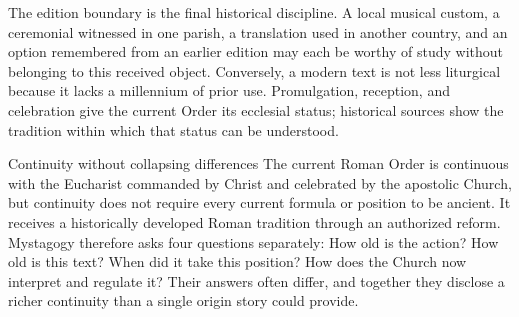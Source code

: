 The edition boundary is the final historical discipline. A local musical custom, a ceremonial witnessed in one parish, a translation used in another country, and an option remembered from an earlier edition may each be worthy of study without belonging to this received object. Conversely, a modern text is not less liturgical because it lacks a millennium of prior use. Promulgation, reception, and celebration give the current Order its ecclesial status; historical sources show the tradition within which that status can be understood.

\begin{studybox}{Continuity without collapsing differences}
The current Roman Order is continuous with the Eucharist commanded by Christ and celebrated by the apostolic Church, but continuity does not require every current formula or position to be ancient. It receives a historically developed Roman tradition through an authorized reform. Mystagogy therefore asks four questions separately: How old is the action? How old is this text? When did it take this position? How does the Church now interpret and regulate it? Their answers often differ, and together they disclose a richer continuity than a single origin story could provide.
\end{studybox}
